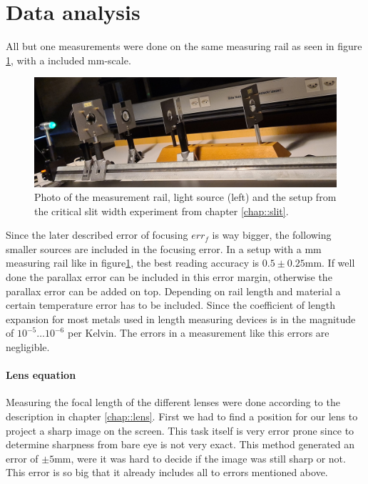 \section{Data analysis}

All but one measurements were done on the same measuring rail as seen in figure \ref{fig::rail}, with a included \si{\milli \m}-scale. 
\begin{figure}[h!]
	\centering
	\includegraphics[width=\textwidth]{img/railcut.jpeg}
	\caption{Photo of the measurement rail, light source (left) and the setup from the critical slit width experiment from chapter \ref{chap::slit}.}
	\label{fig::rail}
\end{figure}

Since the later described error of focusing $err_f$ is way bigger, the following smaller sources are included in the focusing error.
In a setup with a \si{\milli \m} measuring rail like in figure\ref{fig::rail}, the best reading accuracy is $0.5 \pm 0.25$\si{\milli \m}. 
If well done the parallax error can be included in this error margin, otherwise the parallax error can be added on top.
Depending on rail length and material a certain temperature error has to be included. 
Since the coefficient of length expansion for most metals used in length measuring devices is in the magnitude of $10^{-5} \dots 10^{-6}$ per Kelvin.
The errors in a measurement like this errors are negligible. 

\paragraph{Lens equation}
Measuring the focal length of the different lenses were done according to the description in chapter \ref{chap::lens}. 
First we had to find a position for our lens to project a sharp image on the screen.
This task itself is very error prone since to determine sharpness from bare eye is not very exact.
This method generated an error of $\pm 5$\si{\milli\m}, were it was hard to decide if the image was still sharp or not.
This error is so big that it already includes all to errors mentioned above.


